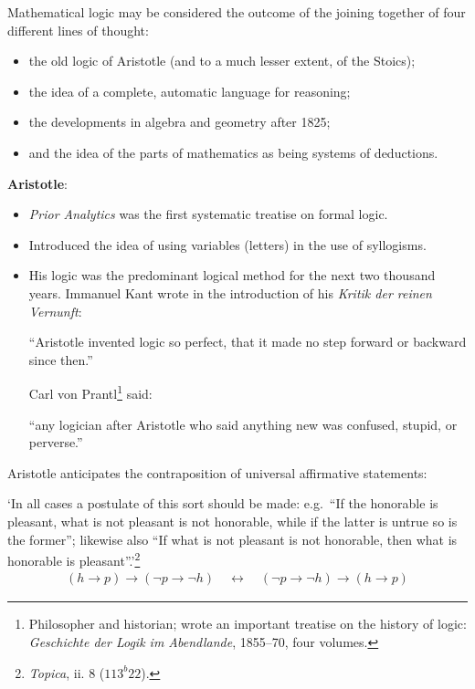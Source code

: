 \documentclass{article}
\begin{document}
Mathematical logic may be considered the outcome of the joining together of
four different lines of thought:
\begin{itemize}
  \item the old logic of Aristotle (and to a much lesser extent, of the Stoics);
  \item the idea of a complete, automatic language for reasoning;
  \item the developments in algebra and geometry after 1825;
  \item and the idea of the parts of mathematics as being systems of deductions.
\end{itemize}

\textbf{Aristotle}:
\begin{itemize}
  \item \textit{Prior Analytics} was the first systematic treatise on formal logic.
  \item Introduced the idea of using variables (letters) in the use of syllogisms.
  \item His logic was the predominant logical method for the next two thousand years.
Immanuel Kant wrote in the introduction of his \textit{Kritik der reinen
Vernunft}:

\enquote{Aristotle invented logic so perfect, that it made no step forward
or backward since then.}

Carl von Prantl\footnote{Philosopher and historian; wrote an important
treatise on the history of logic: \textit{Geschichte der Logik im
Abendlande}, 1855--70, four volumes.} said:

\enquote{any logician after Aristotle who said anything new was confused,
stupid, or perverse.}

\end{itemize}






Aristotle anticipates the contraposition of universal affirmative statements:

`In all cases a postulate of this sort should be made: e.g.\ ``If the honorable
is pleasant, what is not pleasant is not honorable, while if the latter is
untrue so is the former''; likewise also ``If what is not pleasant is not
honorable, then what is honorable is pleasant''.'\footnote{\textit{Topica}, ii.
8 (\(113^b22\)).}
\begin{gather*}
  (h \to p) \to (\neg p \to \neg h) \quad \leftrightarrow \quad (\neg p \to \neg h) \to (h \to p)
\end{gather*}
\end{document}
